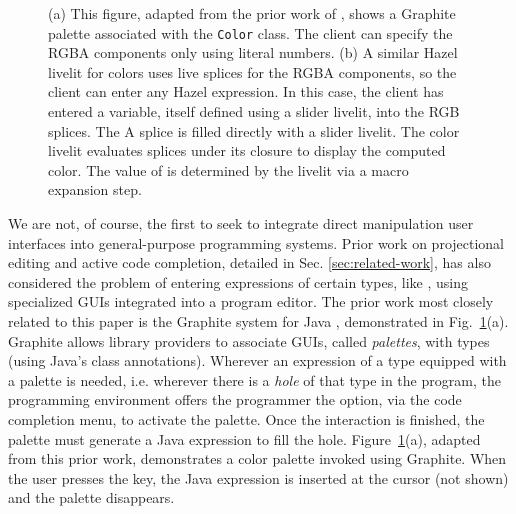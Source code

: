 \begin{figure}
\begin{center}
  \end{center}
  \caption{
  (a) This figure, adapted from the prior work of \citet{Graphite},
  shows a Graphite palette associated with the \texttt{Color} class.
  The client can specify the RGBA components only using literal numbers.
  (b) A similar Hazel livelit for colors uses live splices for the RGBA components,
  so the client can enter any Hazel expression.
  In this case, the client has entered a variable, itself defined using a slider livelit, into the RGB
  splices. The A splice is filled directly with a slider livelit.
  The color livelit evaluates splices under its closure to display the
  computed color.
  The value of  is determined by the livelit via a macro expansion step.}
  \label{fig:color}
\end{figure}

We are not, of course, the first to seek to integrate direct manipulation user interfaces
into general-purpose programming systems.
Prior work on projectional editing
and active code completion, detailed in Sec. \ref{sec:related-work},
has also considered the problem of entering expressions
of certain types, like ,
using specialized GUIs integrated into a program editor.
The prior work most closely related to this paper is the {Graphite} system for Java \cite{Graphite},
demonstrated in Fig.~\ref{fig:color}(a).
Graphite allows library providers to associate GUIs, called \emph{palettes}, with types (using Java's class annotations).
Wherever an expression of a type equipped with a palette is needed,
i.e. wherever there is a \emph{hole} of that type in the program,
the programming environment offers the programmer the option, via the code completion menu,
to activate the palette.
Once the interaction is finished, the palette must generate a
Java expression to fill the hole.
Figure~\ref{fig:color}(a), adapted from this prior work, demonstrates a color palette invoked using Graphite.
When the user presses the  key, the Java expression  is inserted at the cursor (not shown) and the palette disappears.


